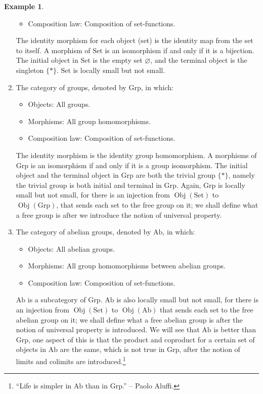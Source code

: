 \documentclass{article}
\theoremstyle{definition}
\theoremstyle{definition}
\newtheorem{example}{Example}[section]
\theoremstyle{remark}
\DeclareMathOperator{\Obj}{Obj}
\begin{document}
\begin{example}
\begin{enumerate}[label=(\roman*)]
\begin{itemize}
			\item Composition law: Composition of set-functions.
		\end{itemize}
	The identity morphism for each object (set) is the identity map from the set to itself. A morphism of $\mathrm{Set}$ is an isomorphism if and only if it is a bijection. The initial object in $\mathrm{Set}$ is the empty set $\varnothing$, and the terminal object is the singleton $\{*\}$. $\mathrm{Set}$ is locally small but not small.
	\item The category of groups, denoted by $\mathrm{Grp}$, in which:
		\begin{itemize}
			\item Objects: All groups.
			\item Morphisms: All group homomorphisms.
			\item Composition law: Composition of set-functions.
		\end{itemize}
	The identity morphism is the identity group homomorphism. A morphisms of $\mathrm{Grp}$ is an isomorphism if and only if it is a group isomorphism. The initial object and the terminal object in $\mathrm{Grp}$ are both the trivial group $\{*\}$, namely the trivial group is both initial and terminal in $\mathrm{Grp}$. Again, $\mathrm{Grp}$ is locally small but not small, for there is an injection from $\Obj(\mathrm{Set})$ to $\Obj(\mathrm{Grp})$, that sends each set to the free group on it; we shall define what a free group is after we introduce the notion of universal property.
\newpage
	\item The category of abelian groups, denoted by $\mathrm{Ab}$, in which:
		\begin{itemize}
			\item Objects: All abelian groups.
			\item Morphisms: All group homomorphisms between abelian groups.
			\item Composition law: Composition of set-functions.
		\end{itemize}
	$\mathrm{Ab}$ is a subcategory of $\mathrm{Grp}$. $\mathrm{Ab}$ is also locally small but not small, for there is an injection from $\Obj(\mathrm{Set})$ to $\Obj(\mathrm{Ab})$ that sends each set to the free abelian group on it; we shall define what a free abelian group is after the notion of universal property is introduced. We will see that $\mathrm{Ab}$ is better than $\mathrm{Grp}$, one aspect of this is that the product and coproduct for a certain set of objects in $\mathrm{Ab}$ are the same, which is not true in $\mathrm{Grp}$, after the notion of limits and colimits are introduced.\footnote{``Life is simpler in $\mathrm{Ab}$ than in $\mathrm{Grp}$.'' -- Paolo Aluffi.}

\end{enumerate}
\end{example}
\end{document}
